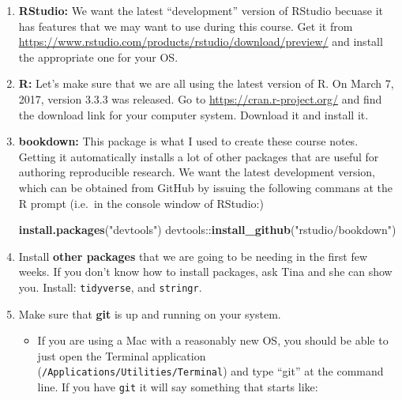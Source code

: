 \documentclass[]{book}
\newenvironment{Shaded}{\begin{snugshade}}{\end{snugshade}}
\newcommand{\KeywordTok}[1]{\textcolor[rgb]{0.13,0.29,0.53}{\textbf{{#1}}}}
\newcommand{\StringTok}[1]{\textcolor[rgb]{0.31,0.60,0.02}{{#1}}}
\newcommand{\NormalTok}[1]{{#1}}
\theoremstyle{definition}
\theoremstyle{definition}
\theoremstyle{remark}
\begin{document}
\begin{enumerate}
\def\labelenumi{\arabic{enumi}.}
\item
  \textbf{RStudio:} We want the latest ``development'' version of
  RStudio becuase it has features that we may want to use during this
  course. Get it from
  \url{https://www.rstudio.com/products/rstudio/download/preview/} and
  install the appropriate one for your OS.
\item
  \textbf{R:} Let's make sure that we are all using the latest version
  of R. On March 7, 2017, version 3.3.3 was released. Go to
  \url{https://cran.r-project.org/} and find the download link for your
  computer system. Download it and install it.
\item
  \textbf{bookdown:} This package is what I used to create these course
  notes. Getting it automatically installs a lot of other packages that
  are useful for authoring reproducible research. We want the latest
  development version, which can be obtained from GitHub by issuing the
  following commans at the R prompt (i.e.~in the console window of
  RStudio:)

\begin{Shaded}
\begin{Highlighting}[]
\KeywordTok{install.packages}\NormalTok{(}\StringTok{"devtools"}\NormalTok{)  }
\NormalTok{devtools::}\KeywordTok{install_github}\NormalTok{(}\StringTok{"rstudio/bookdown"}\NormalTok{)}
\end{Highlighting}
\end{Shaded}
\item
  Install \textbf{other packages} that we are going to be needing in the
  first few weeks. If you don't know how to install packages, ask Tina
  and she can show you. Install: \texttt{tidyverse}, and
  \texttt{stringr}.
\item
  Make sure that \textbf{git} is up and running on your system.

  \begin{itemize}
  \item
    If you are using a Mac with a reasonably new OS, you should be able
    to just open the Terminal application
    (\texttt{/Applications/Utilities/Terminal}) and type ``git'' at the
    command line. If you have \texttt{git} it will say something that
    starts like:


\end{itemize}
\end{enumerate}
\end{document}
